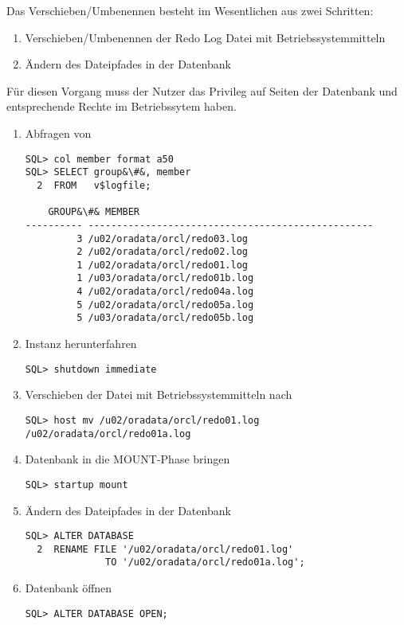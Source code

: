         Das Verschieben/Umbenennen besteht im Wesentlichen aus zwei Schritten:
        \begin{enumerate}
          \item Verschieben/Umbenennen der Redo Log Datei mit Betriebssystemmitteln
          \item Ändern des Dateipfades in der Datenbank
        \end{enumerate}
        Für diesen Vorgang muss der Nutzer das Privileg  auf Seiten der Datenbank und entsprechende Rechte im Betriebssytem haben.
        \begin{enumerate}
          \item Abfragen von 
            \begin{lstlisting}[caption={Speicherorte der Member ermitteln},label=admin35,language=oracle_sql,alsolanguage=sqlplus]
SQL> col member format a50
SQL> SELECT group&\#&, member
  2  FROM   v$logfile;

    GROUP&\#& MEMBER
---------- --------------------------------------------------
         3 /u02/oradata/orcl/redo03.log
         2 /u02/oradata/orcl/redo02.log
         1 /u02/oradata/orcl/redo01.log
         1 /u03/oradata/orcl/redo01b.log
         4 /u02/oradata/orcl/redo04a.log
         5 /u02/oradata/orcl/redo05a.log
         5 /u03/oradata/orcl/redo05b.log
             \end{lstlisting}
          \item Instanz herunterfahren
            \begin{lstlisting}[caption={Instanz herunterfahren},label=admin36,language=sqlplus]
SQL> shutdown immediate
            \end{lstlisting}
          \item Verschieben der Datei  mit Betriebssystemmitteln nach 
            \begin{lstlisting}[caption={Verschieben der Redo Log Datei mit BS Mitteln},label=admin36a,language=sqlplus]
SQL> host mv /u02/oradata/orcl/redo01.log /u02/oradata/orcl/redo01a.log
            \end{lstlisting}
          \item Datenbank in die MOUNT-Phase bringen
            \begin{lstlisting}[caption={Datenbank MOUNTen},label=admin37,language=sqlplus]
SQL> startup mount
            \end{lstlisting}
          \item Ändern des Dateipfades in der Datenbank
                  \begin{lstlisting}[caption={Redo Log Datei umbenennen},label=admin38,language=oracle_sql]
SQL> ALTER DATABASE
  2  RENAME FILE '/u02/oradata/orcl/redo01.log'
              TO '/u02/oradata/orcl/redo01a.log';
            \end{lstlisting}
          \item Datenbank öffnen
            \begin{lstlisting}[caption={Datenbank öffnen},label=admin39,language=oracle_sql]
SQL> ALTER DATABASE OPEN;
            \end{lstlisting}
        \end{enumerate}
